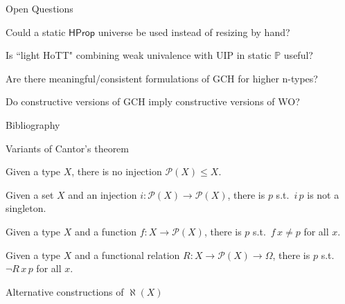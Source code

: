 \documentclass[xcolor=dvipsnames,compress,aspectratio=169,handout]{beamer}
\newcommand{\MBB}[1]{\ensuremath{\mathbb{#1}}\xspace}  %
\newcommand{\MCL}[1]{\ensuremath{\mathcal{#1}}\xspace} %
\newcommand{\Pow}{\MCL P}
\newcommand{\Prop}{\MBB P}
\begin{document}
\begin{frame}{Open Questions}
	\begin{centering}
		\begin{widerbox}
		\center
		Could a static $\mathsf{HProp}$ universe be used instead of resizing by hand?
		\end{widerbox}
		\pause
		\vspace{0.3cm}
		\begin{widerbox}
		\center
		Is ``light HoTT" combining weak univalence with UIP in static $\Prop$ useful?
		\end{widerbox}
		\pause
		\vspace{0.3cm}
		\begin{widerbox}
		\center
		Are there meaningful/consistent formulations of GCH for higher n-types?
		\end{widerbox}
		\pause
		\vspace{0.3cm}
		\begin{widerbox}
		\center
		Do constructive versions of GCH imply constructive versions of WO?
		\end{widerbox}
	\end{centering}
\end{frame}



\begin{frame}{Bibliography}
\footnotesize


\end{frame}

\begin{frame}{Variants of Cantor's theorem}
\begin{fact}
	Given a type $X$, there is no injection $\Pow(X)\le X$.
\end{fact}
\begin{fact}
	Given a set $X$ and an injection $i:\Pow(X)\to\Pow(X)$, there is $p$ s.t.\ $i\,p$ is not a singleton.
\end{fact}
\begin{fact}
	Given a type $X$ and a function $f:X\to \Pow(X)$, there is $p$ s.t.\ $f\,x\not = p$ for all $x$.
\end{fact}
\begin{fact}
	Given a type $X$ and a functional relation $R:X\to \Pow(X)\to\Omega$, there is $p$ s.t.\ $\neg R\,x\,p$ for all $x$.
\end{fact}
\end{frame}

\begin{frame}{Alternative constructions of $\aleph(X)$}
\cite{han2020formal}
\end{frame}
\end{document}
